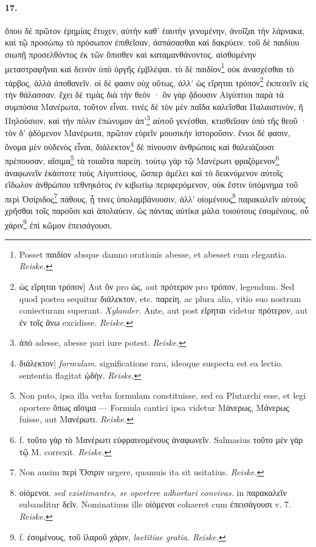\documentclass[a4paper, 11pt, oneside, polutonikogreek, german]{article}
\begin{document}
\paragraph{17.}
ὅπου δὲ πρῶτον ἐρημίας ἔτυχεν, αὐτὴν καθ' ἑαυτὴν γενομένην, ἀνοῖξαι τὴν λάρνακα, καὶ τῷ προσώπῳ τὸ πρόσωπον ἐπιθεῖσαν, ἀσπάσασθαι καὶ δακρύειν. τοῦ δὲ παιδίου σιωπῇ προσελθόντος ἐκ τῶν ὄπισθεν καὶ καταμανθάνοντος, αἰσθομένην μεταστραφῆναι καὶ δεινὸν ὑπὸ ὀργῆς ἐμβλέψαι. τὸ δὲ παιδίον\footnote{Posset παιδίον absque damno orationis abesse, et abesset cum elegantia. \emph{Reiske.}} οὐκ ἀνασχέσθαι τὸ τάρβος, ἀλλὰ ἀποθανεῖν. οἱ δέ φασιν οὐχ οὕτως, ἀλλ' ὡς εἴρηται τρόπον\footnote{ὡς εἴρηται τρόπον] Aut ὃν pro ὡς, aut πρότερον pro τρόπον, legendum. Sed quod postea sequitur διάλεκτον, etc. παρείη, ac plura alia, vitio suo nostram coniecturam superant. \emph{Xylander.} Ante, aut post εἴρηται videtur πρότερον, aut ἐν τοῖς ἂνω excidisse. \emph{Reiske.}} ἐκπεσεῖν εἰς τὴν θάλασσαν. ἔχει δὲ τιμὰς διὰ τὴν θεόν · ὃν γὰρ ᾄδουσιν Αἰγύπτιοι παρὰ τὰ συμπόσια Μανέρωτα, τοῦτον εἶναι. τινὲς δὲ τὸν μὲν παῖδα καλεῖσθαι Παλαιστινὸν, ἢ Πηλούσιον, καὶ τὴν πόλιν ἐπώνυμον ἀπ'\footnote{ἀπὸ adesse, abesse pari iure potest. \emph{Reiske.}} αὐτοῦ γενέσθαι, κτισθεῖσαν ὑπὸ τῆς θεοῦ · τὸν δ' ᾀδόμενον Μανέρωτα, πρῶτον εὑρεῖν μουσικὴν ἱστοροῦσιν. ἔνιοι δέ φασιν, ὄνομα μὲν οὐδενὸς εἶναι, διάλεκτον\footnote{διάλεκτον] \emph{formulam.} significatione rara, ideoque suspecta est ea lectio. sententia flagitat ᾠδὴν. \emph{Reiske.}} δὲ πίνουσιν ἀνθρώποις καὶ θαλειάζουσι πρέπουσαν, αἴσιμα\footnote{Non puto, ipsa illa verba formulam constituisse, sed ea Plutarchi esse, et legi oportere ὅπως αἴσιμα --- Formula cantici ipsa videtur Μάνερως, Μάνερως fuisse, aut Μανέρωτι. \emph{Reiske.}} τὰ τοιαῦτα παρείη. τούτῳ γὰρ τῷ Μανέρωτι φραζόμενον\footnote{f. τοῦτο γὰρ τὸ Μανέρωτι εὐφραινομένους ἀναφωνεῖν. Salmasius τοῦτο μὲν γὰρ τῷ Μ. correxit. \emph{Reiske.}} ἀναφωνεῖν ἑκάστοτε τοὺς Αἰγυπτίους, ὥσπερ ἀμέλει καὶ τὸ δεικνύμενον αὐτοῖς εἴδωλον ἀνθρώπου τεθνηκότος ἐν κιβωτίῳ περιφερόμενον, οὐκ ἔστιν ὑπόμνημα τοῦ περὶ Ὀσίριδος\footnote{Non ausim περὶ Ὄσιριν urgere, quamuis ita sit usitatius. \emph{Reiske.}} πάθους, ᾗ τινες ὑπολαμβάνουσιν, ἀλλ' οἰομένους\footnote{οἰόμενοι. \emph{sed existimantes, se oportere adhortari convivas.} in παρακαλεῖν subauditur δεῖν. Nominatiuus ille οἰόμενοι cohaeret cum ἐπεισάγουσι v. 7. \emph{Reiske.}} παρακαλεῖν αὑτοὺς χρῆσθαι τοῖς παροῦσι καὶ ἀπολαύειν, ὡς πάντας αὐτίκα μάλα τοιούτους ἐσομένους, οὗ χάριν\footnote{f. ἐσομένους, τοῦ ἱλαροῦ χάριν, \emph{laetitiae gratia.} \emph{Reiske.}} ἐπὶ κῶμον ἐπεισάγουσι.
\end{document}
